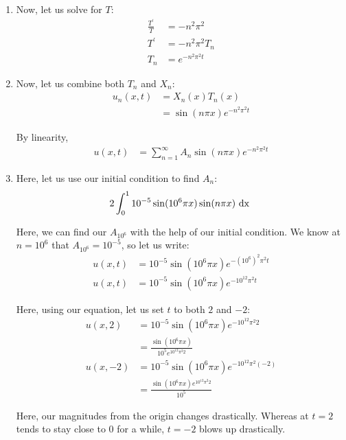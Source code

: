 \documentclass{article}
\begin{document}
\begin{enumerate}
\begin{enumerate}
    \item Now, let us solve for $T$:
    \begin{align}
      \frac{T^\prime}{T} & = - n^2 \pi^2\\
      T^\prime & = - n^2 \pi^2 T_n\\
      T_n & = e^{-n^2 \pi^2 t}
    \end{align}

    \item Now, let us combine both $T_n$ and $X_n$:
    \begin{align}
      u_n(x, t) & = X_n(x)T_n(x)\\
      & = \sin(n \pi x) e^{-n^2 \pi^2 t}
    \end{align}

    By linearity,
    \begin{align}
      u(x, t) & =
      \sum^\infty_{n = 1}
      A_n
      \sin(n \pi x)
      e^{-n^2 \pi^2 t}
    \end{align}

  \item Here, let us use our initial condition to find $A_n$:
  \begin{align}
    2 \int^1_0 10^{-5}\sin(10^6 \pi x) \sin(n \pi x) \text{ dx }
  \end{align}

  Here, we can find our $A_{10^6}$ with the help of our initial condition. We know at $n= 10^6$ that $A_{10^6} = 10^{-5}$, so let us write:
  \begin{align}
    u(x, t) & = 10^{-5} \sin(10^6 \pi x)e^{-(10^6)^2 \pi^2 t}\\
    u(x, t) & = 10^{-5} \sin(10^6 \pi x)e^{-10^{12} \pi^2 t}
  \end{align}

  Here, using our equation, let us set $t$ to both $2$ and $-2$:
  \begin{align}
    u(x, 2) & = 10^{-5} \sin(10^6 \pi x)e^{-10^{12} \pi^2 2}\\
    & = \frac{\sin(10^6 \pi x)}{10^5 e^{10^{12} \pi^2 2}}\\
    u(x, -2) & = 10^{-5} \sin(10^6 \pi x)e^{-10^{12} \pi^2 (-2)}\\
    & = \frac{\sin(10^6 \pi x) e^{10^{12} \pi^2 2}}{10^5}
  \end{align}

  Here, our magnitudes from the origin changes drastically. Whereas at $t = 2$ tends to stay close to $0$ for a while, $t = -2$ blows up drastically.
\end{enumerate}

\end{enumerate}
\end{document}
